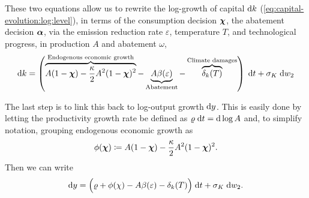 \documentclass[../../main.tex]{subfiles}
\begin{document}
These two equations allow us to rewrite the log-growth of capital $\mathrm{d}k$ (\ref{eq:capital-evolution:log:level}), in terms of the consumption decision $\bm{\chi}$, the abatement decision $\bm{\alpha}$, via the emission reduction rate $\varepsilon$, temperature $T$, and technological progress, in production $A$ and abatement $\omega$, \begin{equation} \label{eq:capital-evolution:log:growth}
    \mathrm{d}k = \left( \overbrace{A (1 - \bm{\chi}) - \frac{\kappa}{2} A^2 (1 - \bm{\chi})^2}^{\text{Endogenous economic growth}} - \underbrace{A \beta(\varepsilon)}_{\text{Abatement}} - \overbrace{\delta_k(T)}^{\text{Climate damages}} \right) \; \mathrm{d}t + \sigma_K \; \mathrm{d}w_2
\end{equation} 

The last step is to link this back to log-output growth $\mathrm{d}y$. This is easily done by letting the productivity growth rate be defined as $\varrho \; \mathrm{d}t = \mathrm{d}\log A$ and, to simplify notation, grouping endogenous economic growth as \begin{equation}
    \phi(\bm{\chi}) \coloneqq A (1 - \bm{\chi}) - \frac{\kappa}{2} A^2 (1 - \bm{\chi})^2.
\end{equation} Then we can write \begin{equation} \label{eq:output-evolution:log}
    \mathrm{d}y = \Big(\varrho + \phi(\chi) - A \beta(\varepsilon) - \delta_k(T) \Big) \; \mathrm{d}t + \sigma_K \; \mathrm{d}w_2.
\end{equation}
\end{document}
